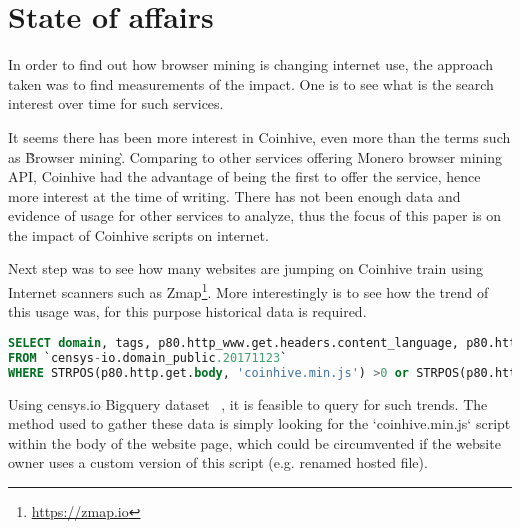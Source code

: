 \section{State of affairs}
In order to find out how browser mining is changing internet use, the approach taken was to find measurements of the impact. One is to see what is the search interest over time for such services. 

\begin{center}
	\caption{Google Trend - Search interest over last 12 months}
\end{center}

It seems there has been more interest in Coinhive, even more than the terms such as \`Browser mining\`. Comparing to other services offering Monero browser mining API, Coinhive had the advantage of being the first to offer the service, hence more interest at the time of writing. There has not been enough data and evidence of usage for other services to analyze, thus the focus of this paper is on the impact of Coinhive scripts on internet. 

Next step was to see how many websites are jumping on Coinhive train using Internet scanners such as Zmap\footnote{\url{https://zmap.io}}. More interestingly is to see how the trend of this usage was, for this purpose historical data is required. 

\begin{lstlisting}[caption={BigQuery SQL query to find websites using coinhive miner script},label={lst:bigquery},language=sql]
SELECT domain, tags, p80.http_www.get.headers.content_language, p80.http_www.get.headers.server, p80.http.get.headers.x_powered_by, p80.http.get.title , p80.http_www.get.body as wwwbody, p80.http.get.body as plainbody
FROM `censys-io.domain_public.20171123`
WHERE STRPOS(p80.http.get.body, 'coinhive.min.js') >0 or STRPOS(p80.http_www.get.body, 'coinhive.min.js') >0)
\end{lstlisting}


Using censys.io Bigquery dataset ~\cite{censys15}, it is feasible to query for such trends. The method used to gather these data is simply looking for the `coinhive.min.js` script within the body of the website page, which could be circumvented if the website owner uses a custom version of this script (e.g. renamed hosted file).


\begin{center}
	\caption{Usage of CoinHive Miner scripts in top 1million websites over time}
\end{center}

